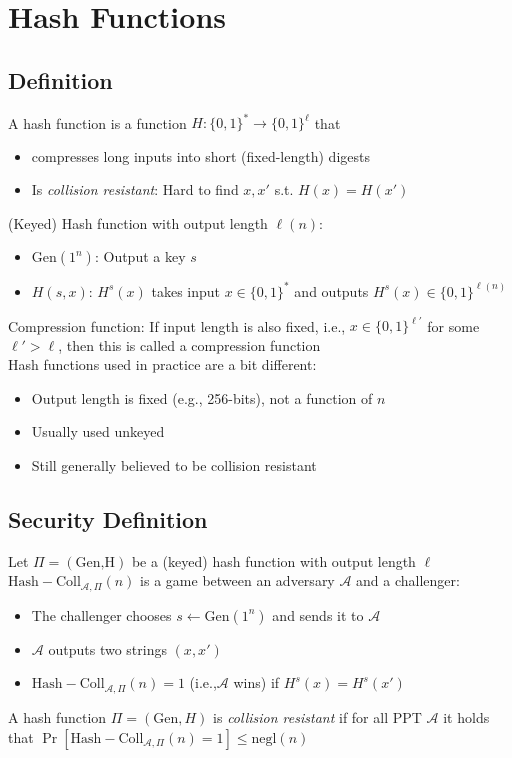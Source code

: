 \section{Hash Functions}
\subsection*{Definition}
A hash function is a function $H:\{0,1\}^*\rightarrow \{0,1\}^{\ell}$ that
\begin{itemize}
    \item compresses long inputs into short (fixed-length) digests
    \item Is \emph{collision resistant}: Hard to find $x,x'$ s.t. $H(x)=H(x')$
\end{itemize}

(Keyed) Hash function with output length $\ell(n)$:
\begin{itemize}
    \item $\text{Gen}(1^n)$: Output a key $s$
    \item $H(s,x)$: $H^s(x)$ takes input $x\in\{0,1\}^*$ and outputs $H^s(x) \in \{0,1\}^{\ell(n)}$
\end{itemize}

Compression function: If input length is also fixed, i.e.,
 $x\in\{0,1\}^{\ell'}$ for some $\ell'>\ell$, then this 
 is called a compression function\\


Hash functions used in practice are a bit different:
\begin{itemize}
    \item Output length is fixed (e.g., 256-bits), not a function of $n$
    \item Usually used unkeyed
    \item Still generally believed to be collision resistant
\end{itemize}
  
\subsection*{Security Definition}
Let $\Pi=(\text{Gen,H})$ be a (keyed) hash function with output length $\ell$
$\text{Hash}-\text{Coll}_{\mathcal{A},\Pi}(n)$ is a game between an adversary $\mathcal{A}$
and a challenger:
\begin{itemize}
    \item The challenger chooses $s\leftarrow \text{Gen}(1^n)$ and sends it to $\mathcal{A}$
    \item $\mathcal{A}$ outputs two strings $(x,x')$
    \item $\text{Hash}-\text{Coll}_{\mathcal{A},\Pi}(n)=1$ (i.e.,$\mathcal{A}$ wins)
    if $H^s(x)=H^s(x')$
\end{itemize}
A hash function $\Pi=(\text{Gen},H)$ is \emph{collision resistant} if for all 
PPT $\mathcal{A}$ it holds that 
$\Pr[\text{Hash}-\text{Coll}_{\mathcal{A},\Pi}(n)=1]\le \text{negl}(n)$

